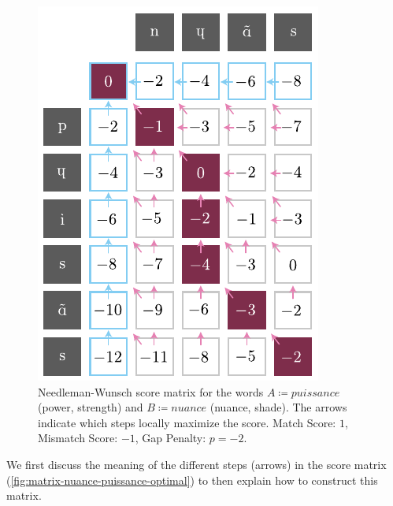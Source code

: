 \begin{figure}[H]
    \centering
    \includegraphics[width=0.77\linewidth]{assets/illustrator/matrix-nuance-puissance-optimal.pdf}
    \caption{Needleman-Wunsch score matrix for the words $A\coloneqq\textit{puissance}$  (power, strength) and $B\coloneqq\textit{nuance}$  (nuance, shade). The arrows indicate which steps locally maximize the score. Match Score: $1$, Mismatch Score: $-1$, Gap Penalty: $p=-2$.}
    \label{fig:matrix-nuance-puissance-optimal}
\end{figure}

\vfill\null

We first discuss the meaning of the different steps (arrows) in the score matrix (\autoref{fig:matrix-nuance-puissance-optimal}) to then explain how to construct this matrix.

